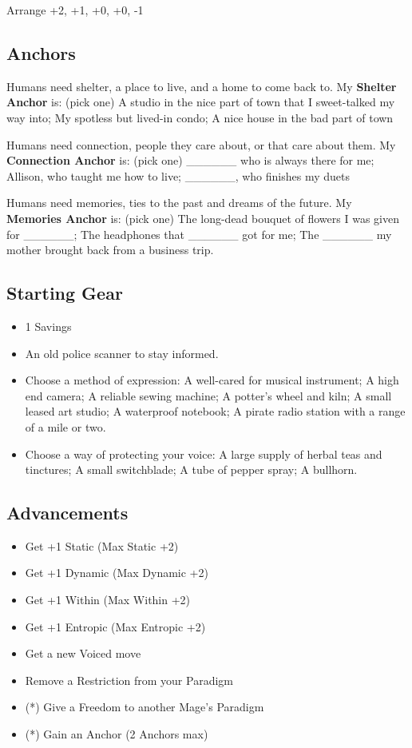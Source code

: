 \documentclass[
  oneside,
  statementpaper,
  9pt]{memoir}
\begin{document}
Arrange +2, +1, +0, +0, -1

\hypertarget{anchors-9}{%
\subsection{Anchors}\label{anchors-9}}

Humans need shelter, a place to live, and a home to come back to. My
\textbf{Shelter Anchor} is: (pick one) A studio in the nice part of town
that I sweet-talked my way into; My spotless but lived-in condo; A nice
house in the bad part of town

Humans need connection, people they care about, or that care about them.
My \textbf{Connection Anchor} is: (pick one) \_\_\_\_\_\_ who is always
there for me; Allison, who taught me how to live; \_\_\_\_\_\_, who
finishes my duets

Humans need memories, ties to the past and dreams of the future. My
\textbf{Memories Anchor} is: (pick one) The long-dead bouquet of flowers
I was given for \_\_\_\_\_\_; The headphones that \_\_\_\_\_\_ got for
me; The \_\_\_\_\_\_ my mother brought back from a business trip.

\hypertarget{starting-gear-7}{%
\subsection{Starting Gear}\label{starting-gear-7}}

\begin{itemize}
\tightlist
\item
  1 Savings
\item
  An old police scanner to stay informed.
\item
  Choose a method of expression: A well-cared for musical instrument; A
  high end camera; A reliable sewing machine; A potter's wheel and kiln;
  A small leased art studio; A waterproof notebook; A pirate radio
  station with a range of a mile or two.
\item
  Choose a way of protecting your voice: A large supply of herbal teas
  and tinctures; A small switchblade; A tube of pepper spray; A
  bullhorn.
\end{itemize}

\hypertarget{advancements-7}{%
\subsection{Advancements}\label{advancements-7}}

\begin{itemize}
\tightlist
\item
  Get +1 Static (Max Static +2)
\item
  Get +1 Dynamic (Max Dynamic +2)
\item
  Get +1 Within (Max Within +2)
\item
  Get +1 Entropic (Max Entropic +2)
\item
  Get a new Voiced move
\item
  Remove a Restriction from your Paradigm
\item
  (*) Give a Freedom to another Mage's Paradigm
\item
  (*) Gain an Anchor (2 Anchors max)
\end{itemize}
\end{document}
